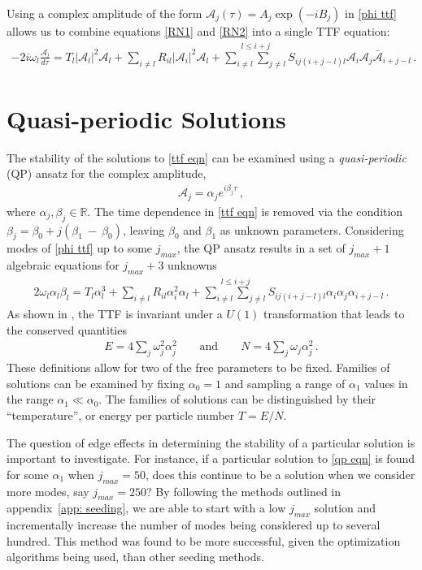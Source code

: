 \documentclass[letterpaper,11pt]{article}
\newcommand{\ol}{\omega_l}
\newcommand{\mc}{\mathcal}
\begin{document}
Using a complex amplitude of the form $\mc A_j(\tau) = A_j \exp (-i B_j )$ in \eqref{phi ttf} allows us to combine equations \eqref{RN1} and \eqref{RN2} into a single TTF equation:
\begin{align}
\label{ttf eqn}
-2i \ol \frac{\mc A_l}{d \tau} = T_l |\mc A_l|^2 \mc A_l + \sum_{i \neq l} R_{il} |\mc A_i|^2 \mc A_l + \stackrel{l \leq i+j}{\sum_{i \neq l} \sum_{j \neq l}} S_{ij(i+j-l)l} \mc A_i \mc A_j \bar{\mc A}_{i+j-l} \, .
\end{align}


\section{Quasi-periodic Solutions}
The stability of the solutions to \eqref{ttf eqn} can be examined using a \emph{quasi-periodic} (QP) ansatz for the complex amplitude,
\begin{align}
\mc A_j = \alpha_j e^{i \beta_j \tau} \, ,
\end{align}
where $\alpha_j, \beta_j \in \mathbb{R}$. The time dependence in \eqref{ttf eqn} is removed via the condition $\beta_j = \beta_0 + j(\beta_1~-~\beta_0)$, leaving $\beta_0$ and $\beta_1$ as unknown parameters. Considering modes of \eqref{phi ttf} up to some $j_{max}$, the QP ansatz results in a set of $j_{max} + 1$ algebraic equations for $j_{max} + 3$ unknowns
\begin{align}
\label{qp eqn}
2 \omega_l \alpha_l \beta_l = T_l \alpha_l^3 + \sum_{i \neq l} R_{il} \alpha_i^2 \alpha_l + \stackrel{l \leq i + j}{\sum_{i \neq l} \sum_{j \neq l}} S_{ij(i+j-l)l} \alpha_i \alpha_j \alpha_{i+j-l} \, .
\end{align}
As shown in \cite{1507.08261}, the TTF is invariant under a $U(1)$ transformation that leads to the conserved quantities
\begin{align}
\label{qp cons}
E = 4\sum_j \omega^2_j \alpha_j^2 \qquad \text{and} \qquad N= 4 \sum_j \omega_j \alpha_j^2 \, .
\end{align}
These definitions allow for two of the free parameters to be fixed. Families of solutions can be examined by fixing $\alpha_0 = 1$ and sampling a range of $\alpha_1$ values in the range $\alpha_1 \ll \alpha_0$. The families of solutions can be distinguished by their ``temperature'', or energy per particle number $T=E/N$. 

The question of edge effects in determining the stability of a particular solution is important to investigate. For instance, if a particular solution to \eqref{qp eqn} is found for some $\alpha_1$ when $j_{max} = 50$, does this continue to be a solution when we consider more modes, say $j_{max} = 250$? By following the methods outlined in appendix~\ref{app: seeding}, we are able to start with a low $j_{max}$ solution and incrementally increase the number of modes being considered up to several hundred. This method was found to be more successful, given the optimization algorithms being used, than other seeding methods.
\end{document}
